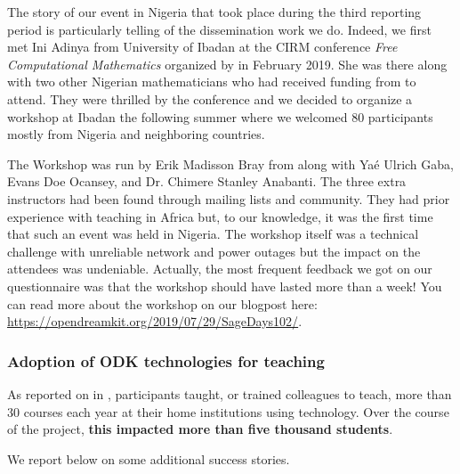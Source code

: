 \begin{enumerate}
  The story of our event in Nigeria that took place during the third reporting period is particularly telling of the 
  dissemination work we do. Indeed, we first met Ini Adinya from University of Ibadan at the
  CIRM conference \emph{Free Computational Mathematics} organized by \ODK in February 2019. She 
  was there along with two other Nigerian mathematicians who had received funding from \ODK to attend. 
  They were thrilled by the conference and we decided to organize a \Sage workshop at Ibadan the 
  following summer where we welcomed 80 participants mostly from Nigeria and neighboring countries.
  
  The Workshop was run by Erik Madisson Bray from \ODK along with Yaé Ulrich Gaba, Evans Doe Ocansey, and Dr. Chimere 
  Stanley Anabanti. The three extra instructors had been found through \Sage mailing lists and community. They had prior
  experience with teaching \Sage in Africa but, to our knowledge, it was the first time that such an event was held in Nigeria.
  The workshop itself was a technical challenge with unreliable network and power outages but the impact on the attendees was
  undeniable. Actually, the most frequent feedback we got on our questionnaire was that the workshop should have lasted more than 
  a week! You can read more about the workshop on our blogpost here: \url{https://opendreamkit.org/2019/07/29/SageDays102/}.
\end{enumerate}

\subsubsection{Adoption of ODK technologies for teaching}

As reported on in , \ODK
participants taught, or trained colleagues to teach, more than 30
courses each year at their home institutions using \ODK
technology. Over the course of the project, \textbf{this impacted more
  than five thousand students}.

We report below on some additional success stories.

